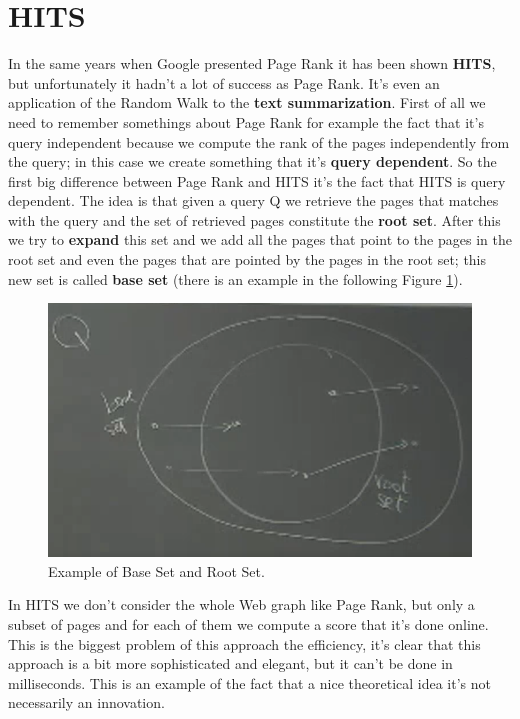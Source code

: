 \section{HITS}
In the same years when Google presented Page Rank it has been shown \textbf{HITS}, but unfortunately it hadn't a lot of success as Page Rank.\newline
It's even an application of the Random Walk to the \textbf{text summarization}.\newline
First of all we need to remember somethings about Page Rank for example the fact that it's query independent because we compute the rank of the pages independently from the query; in this case we create something that it's \textbf{query dependent}. So the first big difference between Page Rank and HITS it's the fact that HITS is query dependent.\newline
The idea is that given a query Q we retrieve the pages that matches with the query and the set of retrieved pages constitute the \textbf{root set}. After this we try to \textbf{expand} this set and we add all the pages that point to the pages in the root set and even the pages that are pointed by the pages in the root set; this new set is called \textbf{base set} (there is an example in the following Figure \ref{fig:baseset}).\newline
\begin{figure}
    \centering
    \includegraphics[width=0.75\linewidth]{images/baseset.PNG}
    \caption{Example of Base Set and Root Set.}
    \label{fig:baseset}
\end{figure}
In HITS we don't consider the whole Web graph like Page Rank, but only a subset of pages and for each of them we compute a score that it's done online. This is the biggest problem of this approach the efficiency, it's clear that this approach is a bit more sophisticated and elegant, but it can't be done in milliseconds. This is an example of the fact that a nice theoretical idea it's not necessarily an innovation.\newline

